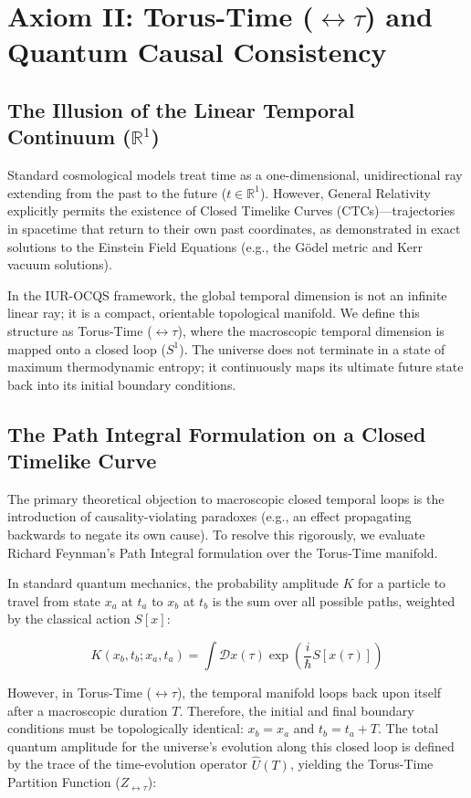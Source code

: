 \documentclass[12pt,openany]{book}
\begin{document}
\section{Axiom II: Torus-Time ($\leftrightarrow\tau$) and Quantum Causal Consistency}

\subsection{The Illusion of the Linear Temporal Continuum ($\mathbb{R}^1$)}
Standard cosmological models treat time as a one-dimensional, unidirectional ray extending from the past to the future ($t \in \mathbb{R}^1$). However, General Relativity explicitly permits the existence of Closed Timelike Curves (CTCs)---trajectories in spacetime that return to their own past coordinates, as demonstrated in exact solutions to the Einstein Field Equations (e.g., the G\"{o}del metric and Kerr vacuum solutions).

In the IUR-OCQS framework, the global temporal dimension is not an infinite linear ray; it is a compact, orientable topological manifold. We define this structure as Torus-Time ($\leftrightarrow\tau$), where the macroscopic temporal dimension is mapped onto a closed loop ($S^1$). The universe does not terminate in a state of maximum thermodynamic entropy; it continuously maps its ultimate future state back into its initial boundary conditions.

\subsection{The Path Integral Formulation on a Closed Timelike Curve}
The primary theoretical objection to macroscopic closed temporal loops is the introduction of causality-violating paradoxes (e.g., an effect propagating backwards to negate its own cause). To resolve this rigorously, we evaluate Richard Feynman's Path Integral formulation over the Torus-Time manifold. 

In standard quantum mechanics, the probability amplitude $K$ for a particle to travel from state $x_a$ at $t_a$ to $x_b$ at $t_b$ is the sum over all possible paths, weighted by the classical action $S[x]$:

\begin{equation}
K(x_b, t_b; x_a, t_a) = \int \mathcal{D}x(\tau) \exp\left(\frac{i}{\hbar}S[x(\tau)]\right)
\end{equation}

However, in Torus-Time ($\leftrightarrow\tau$), the temporal manifold loops back upon itself after a macroscopic duration $T$. Therefore, the initial and final boundary conditions must be topologically identical: $x_b = x_a$ and $t_b = t_a + T$. The total quantum amplitude for the universe's evolution along this closed loop is defined by the trace of the time-evolution operator $\hat{U}(T)$, yielding the Torus-Time Partition Function ($Z_{\leftrightarrow\tau}$):
\end{document}
